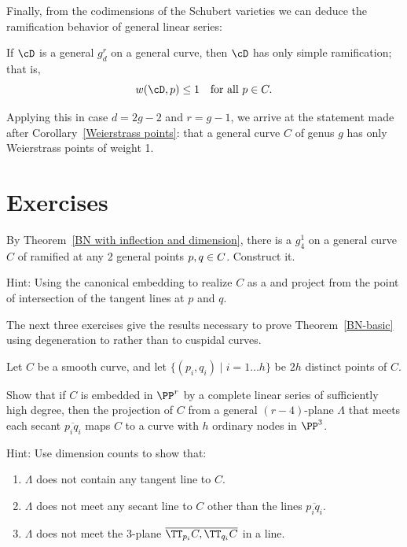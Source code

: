 Finally, from the codimensions of the Schubert varieties  we can deduce
the ramification behavior of general
linear series:

\begin{theorem}
If $\cD$ is a general $g^r_d$ on a general curve, then $\cD$ has only
%
simple ramification; that is,
$$
w(\cD, p) \leq 1 \quad \text{for all } p \in C.
$$
\end{theorem}

Applying this in case $d=2g-2$ and $r = g-1$, we arrive at the
statement made
after Corollary~\ref{Weierstrass points}:
that a general
curve $C$ of genus $g$ has only Weierstrass points of weight 1.

\section{Exercises}

\begin{exercise}
  By Theorem~\ref{BN with inflection and dimension}, there is a $g^1_4$
  on a general curve $C$ of 
ramified at any 2 general points $p,
\index{g@$g^1_4$}%
\index{genus 3}%
  q \in C$. Construct it.

  Hint: Using the canonical embedding to realize $C$ as a 
%
  and project from the point of intersection of the tangent lines at $p$
  and $q$.
\end{exercise}

The 
next 
three exercises give the results necessary to prove
Theorem~\ref{BN-basic} using degeneration to
%
rather than to cuspidal curves.

\begin{exercise}
\label{independent secants}
\label{Constructing nodal curves} 
Let $C$ be a smooth curve,
and let
 $\{(p_{i}, q_{i}) \mid i = 1\dots h\}$ be $2h$ distinct points of $C$.

Show that if $C$ is embedded in $\PP^{r}$ by a complete linear series
of sufficiently high degree, then the
projection of $C$ from a general $(r-4)$-plane $\Lambda$ that meets each
secant $\overline{p_{i} q_{i}}$
maps $C$ to a curve with $h$ ordinary nodes in $\PP^{3}$.

Hint: Use dimension counts to show that:
\begin{enumerate}
\item $\Lambda$ does not contain any tangent line to $C$.
\item $\Lambda$ does not meet any secant line to $C$ other than the
lines  $\overline{p_{i} q_{i}}$.
\item $\Lambda$ does not meet the 3-plane $\overline{\TT_{p_i}C,
\TT_{q_i}C}$ in a line.
\end{enumerate}
 \end{exercise}

